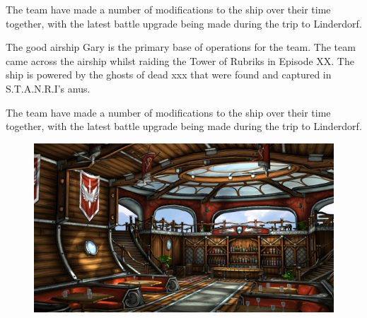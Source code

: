 \begin{multicols}{2}
The team have made a number of modifications to the ship over their time together, with the latest battle upgrade being made during the trip to Linderdorf.  

The good airship Gary is the primary base of operations for the team.  The team came across the airship whilst raiding the Tower of Rubriks in Episode XX.  The ship is powered by the ghosts of dead xxx that were found and captured in S.T.A.N.R.I's anus.  

The team have made a number of modifications to the ship over their time together, with the latest battle upgrade being made during the trip to Linderdorf.  

\end{multicols}

\begin{center}
\begin{figure}[h]
\includegraphics[width=\textwidth]{./content/img/theGaryInside.jpg}
\end{figure}
\end{center}

\clearpage

\vspace*{20mm}

